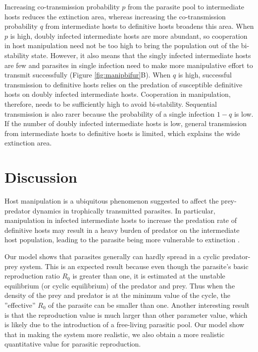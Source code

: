 \documentclass[11pt]{article}
\begin{document}
Increasing co-transmission probability $p$ from the parasite pool to intermediate hosts reduces the extinction area, whereas increasing the co-transmission probability $q$ from intermediate hosts to definitive hosts broadens this area. 
When $p$ is high, doubly infected intermediate hosts are more abundant, so cooperation in host manipulation need not be too high to bring the population out of the bi-stability state. 
However, it also means that the singly infected intermediate hosts are few and parasites in single infection need to make more manipulative effort to transmit successfully (Figure \ref{fig:manipbifur}B). 
When $q$ is high, successful transmission to definitive hosts relies on the predation of susceptible definitive hosts on doubly infected intermediate hosts. 
Cooperation in manipulation, therefore, needs to be sufficiently high to avoid bi-stability. 
Sequential transmission is also rarer because the probability of a single infection $1-q$ is low. 
If the number of doubly infected intermediate hosts is low, general transmission from intermediate hosts to definitive hosts is limited, which explains the wide extinction area.

\section*{Discussion}
Host manipulation is a ubiquitous phenomenon suggested to affect the prey-predator dynamics in trophically transmitted parasites. 
In particular, manipulation in infected intermediate hosts to increase the predation rate of definitive hosts may result in a heavy burden of predator on the intermediate host population, leading to the parasite being more vulnerable to extinction \citep{Hadeler1989, Fenton2006}. 


Our model shows that parasites generally can hardly spread in a cyclic predator-prey system. 
This is an expected result because even though the parasite's basic reproduction ratio $R_0$ is greater than one, it is estimated at the unstable equilibrium (or cyclic equilibrium) of the predator and prey. 
Thus when the density of the prey and predator is at the minimum value of the cycle, the ''effective'' $R_0$ of the parasite can be smaller than one. Another interesting result is that the reproduction value is much larger than other parameter value, which is likely due to the introduction of a free-living parasitic pool. Our model show that in making the system more realistic, we also obtain a more realistic quantitative value for parasitic reproduction.
\end{document}
